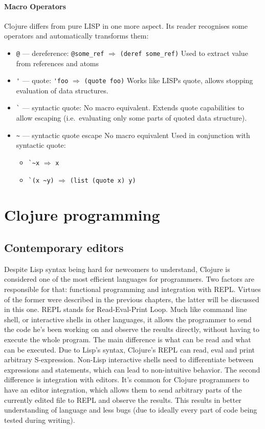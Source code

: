 \documentclass[english,mgr,shortabstract]{iithesis}
\begin{document}
\subsubsection{Macro Operators}
Clojure differs from pure LISP in one more aspect.
Its reader recognises some operators and automatically transforms them:
\begin{itemize}
  \item \lstinline|@| --- dereference:
\lstinline|@some_ref| $\Rightarrow$ \lstinline|(deref some_ref)|
Used to extract value from references and atoms
  \item \lstinline|'| --- quote:
\lstinline|'foo| $\Rightarrow$ \lstinline|(quote foo)|
Works like LISPs quote, allows stopping evaluation of data structures.
  \item \lstinline|`| --- syntactic quote:
No macro equivalent.
Extends quote capabilities to allow escaping (i.e.\ evaluating only some parts of
quoted data structure).

  \item \lstinline|~| --- syntactic quote escape
No macro equivalent
Used in conjunction with syntactic quote:
\begin{itemize}
  \item \lstinline|`~x| $\Rightarrow$ \lstinline|x|
  \item \lstinline|`(x ~y)|
  $\Rightarrow$ \texttt{(list (quote x) y)}
\end{itemize}
\end{itemize}

\chapter{Clojure programming}
\section{Contemporary editors}
Despite Lisp syntax being hard for newcomers to understand, Clojure is
considered one of the most efficient languages for programmers.
Two factors are responsible for that: functional programming and integration
with REPL.\@
Virtues of the former were described in the previous chapters, the latter will
be discussed in this one.
REPL stands for Read-Eval-Print Loop.
Much like command line shell, or interactive shells in other languages, it
allows the programmer to send the code he’s been working on and observe the
results directly, without having to execute the whole program.
The main difference is what can be read and what can be executed.
Due to Lisp’s syntax, Clojure’s REPL can read, eval and print arbitrary
S-expression.
Non-Lisp interactive shells need to differentiate between expressions and
statements, which can lead to non-intuitive behavior.
The second difference is integration with editors.
It’s common for Clojure programmers to have an editor integration, which allows
them to send arbitrary parts of the currently edited file to REPL and observe
the results.
This results in better understanding of language and less bugs (due to ideally
every part of code being tested during writing).
\end{document}
